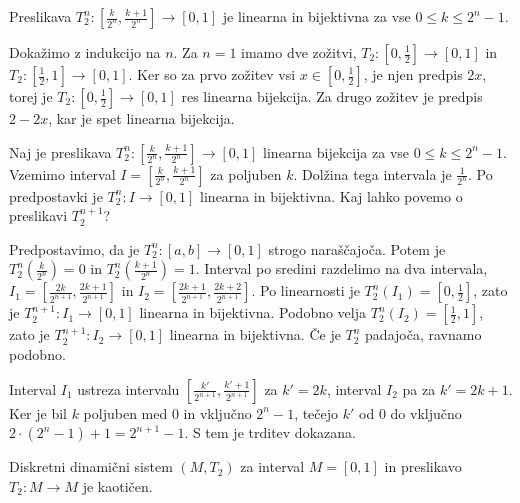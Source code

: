 \documentclass{isrmdelo}
\begin{document}
\begin{trditev}
Preslikava $T_2^n : [\frac{k}{2^n}, \frac{k+1}{2^n}] \rightarrow [0,1]$ je linearna in bijektivna za vse $0 \leq k \leq 2^n - 1$. 
\end{trditev}

\begin{dokaz}
Dokažimo z indukcijo na $n$. Za $n=1$ imamo dve zožitvi, $T_2: [0, \frac{1}{2}] \rightarrow [0,1]$ in $T_2: [\frac{1}{2}, 1] \rightarrow [0,1]$. Ker so za prvo zožitev vsi $x \in [0, \frac{1}{2}]$, je njen predpis $2x$, torej je $T_2: [0, \frac{1}{2}] \rightarrow [0,1]$ res linearna bijekcija. Za drugo zožitev je predpis $2 - 2x$, kar je spet linearna bijekcija.

\medskip

Naj je preslikava $T_2^n: [\frac{k}{2^n}, \frac{k+1}{2^n}] \rightarrow [0,1]$ linearna bijekcija za vse $0 \leq k \leq 2^n - 1$. Vzemimo interval $I = [\frac{k}{2^n}, \frac{k+1}{2^n}]$ za poljuben $k$. Dolžina tega intervala je $\frac{1}{2^n}$. Po predpostavki je $T_2^n: I \rightarrow [0,1]$ linearna in bijektivna. Kaj lahko povemo o preslikavi $T_2^{n+1}$?

Predpostavimo, da je $T_2^n: [a,b] \rightarrow [0,1]$ strogo naraščajoča. Potem je $T_2^n(\frac{k}{2^n}) = 0$ in $T_2^n(\frac{k+1}{2^n}) = 1$. Interval po sredini razdelimo na dva intervala, $I_1 = [\frac{2k}{2^{n+1}}, \frac{2k+1}{2^{n+1}}]$ in $I_2 = [\frac{2k+1}{2^{n+1}}, \frac{2k+2}{2^{n+1}}]$. Po linearnosti je $T_2^n(I_1) = [0, \frac{1}{2}]$, zato je $T_2^{n+1}: I_1 \rightarrow [0,1]$ linearna in bijektivna. Podobno velja $T_2^n(I_2) = [\frac{1}{2}, 1]$, zato je $T_2^{n+1}: I_2 \rightarrow [0,1]$ linearna in bijektivna. Če je $T_2^n$ padajoča, ravnamo podobno.

\medskip

Interval $I_1$ ustreza intervalu $[\frac{k'}{2^{n+1}}, \frac{k'+1}{2^{n+1}}]$ za $k' = 2k$, interval $I_2$ pa za $k' = 2k+1$. Ker je bil $k$ poljuben med $0$ in vključno $2^n-1$, tečejo $k'$ od $0$ do vključno $2 \cdot (2^n-1) + 1 = 2^{n+1} - 1$. S tem je trditev dokazana. \qedhere
\end{dokaz}

\bigskip

\begin{trditev}
Diskretni dinamični sistem $(M, T_2)$ za interval $M = [0,1]$ in preslikavo $T_2: M \rightarrow M$ je kaotičen.
\end{trditev}
\end{document}
